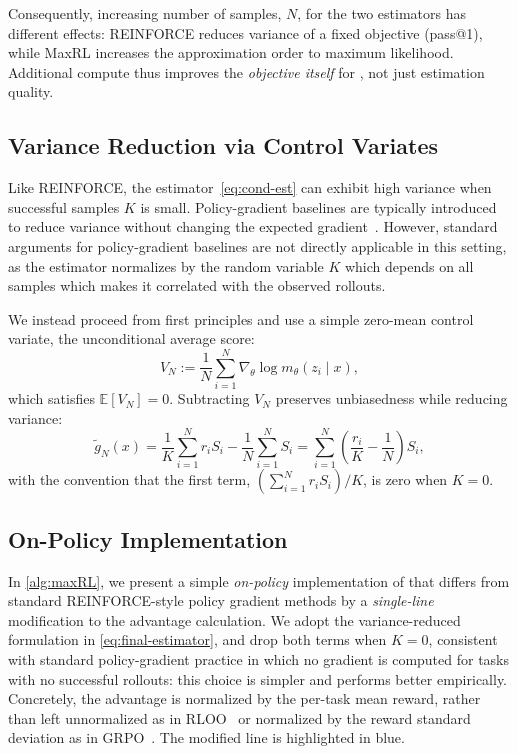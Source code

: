 \documentclass[10pt]{article} %
\begin{document}
Consequently, increasing number of samples, $N$, for the two estimators has different effects: REINFORCE reduces 
variance of a fixed objective (pass@1), while MaxRL increases the approximation 
order to maximum likelihood. Additional compute thus improves the \emph{objective itself} for 
\ours{}, not just estimation quality.


\subsection{Variance Reduction via Control Variates}
\label{sec:variance_reduction}

Like REINFORCE, the estimator~\eqref{eq:cond-est} can exhibit high variance when 
successful samples $K$ is small. 
Policy-gradient baselines are typically introduced to reduce variance without
changing the expected gradient~\citep{sutton1988learning}. However, standard arguments for policy-gradient
baselines are not directly applicable in this setting, as the estimator
normalizes by the random variable $K$ which depends on all samples which makes it  correlated with the observed rollouts.

We instead proceed from first principles and use a simple zero-mean control variate, the unconditional average score:
\[
V_N := \frac{1}{N}\sum_{i=1}^N \nabla_\theta \log m_\theta(z_i \mid x),
\]
which satisfies $\mathbb{E}[V_N]=0$. Subtracting $V_N$ preserves unbiasedness while 
reducing variance:
\begin{equation}
\widetilde g_N(x)
=
\frac{1}{K}\sum_{i=1}^N r_i S_i
-
\frac{1}{N}\sum_{i=1}^N S_i
=
\sum_{i=1}^N\!\left(\frac{r_i}{K}-\frac{1}{N}\right)S_i,
\label{eq:final-estimator}
\end{equation}
with the convention that the first term, $\left(\sum_{i = 1}^N r_iS_i\right)/K$, is zero when $K=0$. 

\subsection{On-Policy Implementation}
In \cref{alg:maxRL}, we present a simple \emph{on-policy} implementation of \ours{}
that differs from standard REINFORCE-style policy gradient methods by a
\emph{single-line} modification to the advantage calculation. We adopt the
variance-reduced formulation in \cref{eq:final-estimator}, and drop both terms
when $K=0$, consistent with standard policy-gradient practice in which no
gradient is computed for tasks with no successful rollouts: this choice is
simpler and performs better empirically. Concretely, the advantage is normalized
by the per-task mean reward, rather than left unnormalized as in
RLOO~\citep{ahmadian2024basicsrevisitingreinforcestyle} or normalized by the reward
standard deviation as in
GRPO~\citep{shao2024deepseekmathpushinglimitsmathematical}. The modified line is
highlighted in blue.
\end{document}
